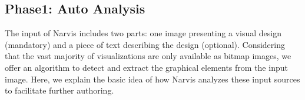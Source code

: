 \subsection{Phase1: Auto Analysis}
The input of Narvis includes two parts: one image presenting a visual design (mandatory) and a piece of text describing the design (optional). Considering that the vast majority of visualizations are only available as bitmap images, we offer an algorithm to detect and extract the graphical elements from the input image. Here, we explain the basic idea of how Narvis analyzes these input sources to facilitate further authoring. 
%    
    

